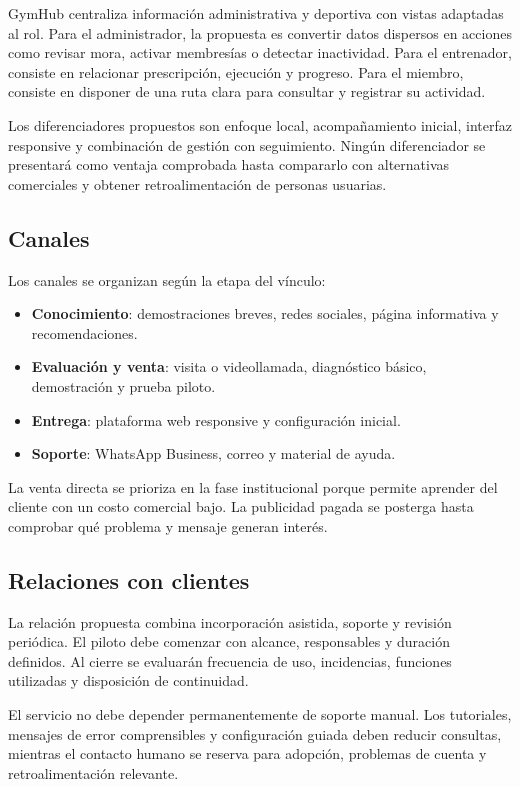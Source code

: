 GymHub centraliza información administrativa y deportiva con vistas adaptadas al
rol. Para el administrador, la propuesta es convertir datos dispersos en acciones
como revisar mora, activar membresías o detectar inactividad. Para el entrenador,
consiste en relacionar prescripción, ejecución y progreso. Para el miembro,
consiste en disponer de una ruta clara para consultar y registrar su actividad.

Los diferenciadores propuestos son enfoque local, acompañamiento inicial,
interfaz responsive y combinación de gestión con seguimiento. Ningún diferenciador
se presentará como ventaja comprobada hasta compararlo con alternativas comerciales
y obtener retroalimentación de personas usuarias.

\subsection{Canales}

Los canales se organizan según la etapa del vínculo:

\begin{itemize}
  \item \textbf{Conocimiento}: demostraciones breves, redes sociales, página
  informativa y recomendaciones.
  \item \textbf{Evaluación y venta}: visita o videollamada, diagnóstico básico,
  demostración y prueba piloto.
  \item \textbf{Entrega}: plataforma web responsive y configuración inicial.
  \item \textbf{Soporte}: WhatsApp Business, correo y material de ayuda.
\end{itemize}

La venta directa se prioriza en la fase institucional porque permite aprender del
cliente con un costo comercial bajo. La publicidad pagada se posterga hasta
comprobar qué problema y mensaje generan interés.

\subsection{Relaciones con clientes}

La relación propuesta combina incorporación asistida, soporte y revisión
periódica. El piloto debe comenzar con alcance, responsables y duración definidos.
Al cierre se evaluarán frecuencia de uso, incidencias, funciones utilizadas y
disposición de continuidad.

El servicio no debe depender permanentemente de soporte manual. Los tutoriales,
mensajes de error comprensibles y configuración guiada deben reducir consultas,
mientras el contacto humano se reserva para adopción, problemas de cuenta y
retroalimentación relevante.

